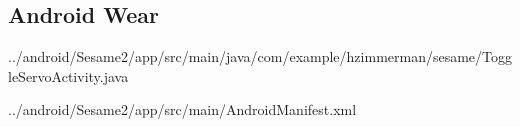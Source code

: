 \documentclass[a4paper]{article}
\begin{document}
\subsection{Android Wear}\label{subsec:androidWear}

{../android/Sesame2/app/src/main/java/com/example/hzimmerman/sesame/ToggleServoActivity.java}


{../android/Sesame2/app/src/main/AndroidManifest.xml}
\end{document}
